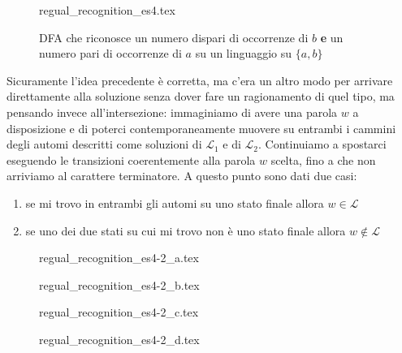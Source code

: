 \documentclass[class=book, crop=false, oneside, 12pt]{standalone}
\begin{document}
\begin{figure}[H]
    \centering
    {regual_recognition_es4.tex}
    \caption{DFA che riconosce un numero dispari di occorrenze di \(b\) \textbf{e} un numero pari di occorrenze di \(a\) su un linguaggio su \(\{a,b\}\)}
    \label{dfa-b_odd-and-a_even}
\end{figure}

Sicuramente l'idea precedente è corretta, ma c'era un altro modo per arrivare direttamente alla soluzione senza dover fare un ragionamento di quel tipo, ma pensando invece all'intersezione: immaginiamo di avere una parola \(w\) a disposizione e di poterci contemporaneamente muovere su entrambi i cammini degli automi descritti come soluzioni di \(\mathcal{L}_1\) e di \(\mathcal{L}_2\). Continuiamo a spostarci eseguendo le transizioni coerentemente alla parola \(w\) scelta, fino a che non arriviamo al carattere terminatore. A questo punto sono dati due casi:
\begin{enumerate}
    \item se mi trovo in entrambi gli automi su uno stato finale allora \(w \in \mathcal{L}\)
    \item se uno dei due stati su cui mi trovo non è uno stato finale allora \(w \notin \mathcal{L}\)
\end{enumerate}
\begin{figure}[H]
    \begin{minipage}[b]{0.4\textwidth}
        \centering
        {regual_recognition_es4-2_a.tex}
        \label{pl-es4-sbs_1}
    \end{minipage}
    \hfill
    \begin{minipage}[b]{0.4\textwidth}
        \centering
        {regual_recognition_es4-2_b.tex}
        \label{pl-es4-sbs_2}
    \end{minipage}

    \begin{minipage}[b]{0.4\textwidth}
        \centering
        {regual_recognition_es4-2_c.tex}
        \label{pl-es4-sbs_3}
    \end{minipage}
    \hfill
    \begin{minipage}[b]{0.4\textwidth}
        \centering
        {regual_recognition_es4-2_d.tex}
        \label{pl-es4-sbs_4}
    \end{minipage}
    \caption{}
\end{figure}
\end{document}
